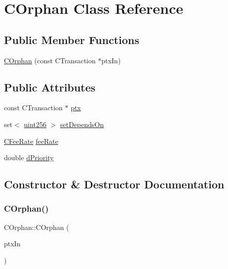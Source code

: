 \hypertarget{class_c_orphan}{}\section{C\+Orphan Class Reference}
\label{class_c_orphan}
\subsection*{Public Member Functions}
\begin{DoxyCompactItemize}
\item 
\mbox{\hyperlink{class_c_orphan_a7950b07537159af9de79cdc60d836d46}{C\+Orphan}} (const C\+Transaction $\ast$ptx\+In)
\end{DoxyCompactItemize}
\subsection*{Public Attributes}
\begin{DoxyCompactItemize}
\item 
const C\+Transaction $\ast$ \mbox{\hyperlink{class_c_orphan_a6bc886fad47f30a4c1cc80dc764e4095}{ptx}}
\item 
set$<$ \mbox{\hyperlink{classuint256}{uint256}} $>$ \mbox{\hyperlink{class_c_orphan_a1b19183565d42c20ded09a2cc787fc50}{set\+Depends\+On}}
\item 
\mbox{\hyperlink{class_c_fee_rate}{C\+Fee\+Rate}} \mbox{\hyperlink{class_c_orphan_a2aab629162d580085082408643149e92}{fee\+Rate}}
\item 
double \mbox{\hyperlink{class_c_orphan_a899f7928b6d4e9206ce04d5b2953da33}{d\+Priority}}
\end{DoxyCompactItemize}


\subsection{Constructor \& Destructor Documentation}
\mbox{\label{class_c_orphan_a7950b07537159af9de79cdc60d836d46}} 
\subsubsection{\texorpdfstring{C\+Orphan()}{COrphan()}}
{\footnotesize\ttfamily C\+Orphan\+::\+C\+Orphan (\begin{DoxyParamCaption}\item[{const C\+Transaction $\ast$}]{ptx\+In }\end{DoxyParamCaption})\hspace{0.3cm}{\ttfamily [inline]}}



